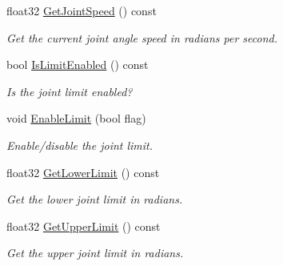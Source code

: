 \begin{DoxyCompactItemize}
\mbox{\label{classb2RevoluteJoint_a631b7bd2c72b61f03b6efc605308092f}} 
float32 \hyperlink{classb2RevoluteJoint_a631b7bd2c72b61f03b6efc605308092f}{Get\+Joint\+Speed} () const
\begin{DoxyCompactList}\small\item\em Get the current joint angle speed in radians per second. \end{DoxyCompactList}\item 
\mbox{\label{classb2RevoluteJoint_a84ff9c4f82b3e7d27a4390164f81f3ab}} 
bool \hyperlink{classb2RevoluteJoint_a84ff9c4f82b3e7d27a4390164f81f3ab}{Is\+Limit\+Enabled} () const
\begin{DoxyCompactList}\small\item\em Is the joint limit enabled? \end{DoxyCompactList}\item 
\mbox{\label{classb2RevoluteJoint_a56bdfdd04e906e52d0258f6a481b9093}} 
void \hyperlink{classb2RevoluteJoint_a56bdfdd04e906e52d0258f6a481b9093}{Enable\+Limit} (bool flag)
\begin{DoxyCompactList}\small\item\em Enable/disable the joint limit. \end{DoxyCompactList}\item 
\mbox{\label{classb2RevoluteJoint_a1e34ad0cc3289d90bff8140c5d6261d2}} 
float32 \hyperlink{classb2RevoluteJoint_a1e34ad0cc3289d90bff8140c5d6261d2}{Get\+Lower\+Limit} () const
\begin{DoxyCompactList}\small\item\em Get the lower joint limit in radians. \end{DoxyCompactList}\item 
\mbox{\label{classb2RevoluteJoint_a5c30cf83116841607d4d819985732efb}} 
float32 \hyperlink{classb2RevoluteJoint_a5c30cf83116841607d4d819985732efb}{Get\+Upper\+Limit} () const
\begin{DoxyCompactList}\small\item\em Get the upper joint limit in radians. \end{DoxyCompactList}\item 
\mbox{\label{classb2RevoluteJoint_a32f9393d8a6b993fd523f0f643c28107}} 

\end{DoxyCompactItemize}
